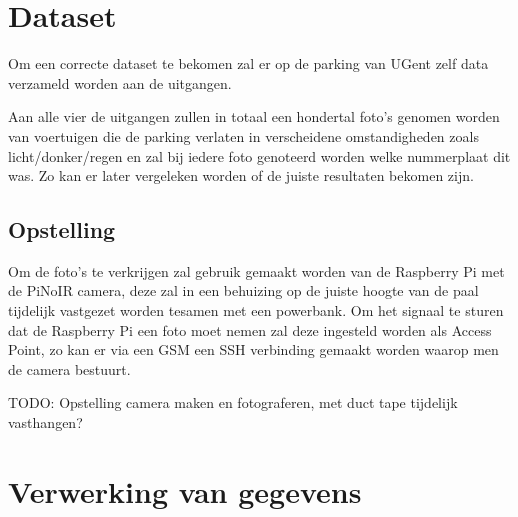 \section{Dataset}
Om een correcte dataset te bekomen zal er op de parking van UGent zelf data verzameld worden aan de uitgangen.

Aan alle vier de uitgangen zullen in totaal een hondertal foto's genomen worden van voertuigen die de parking verlaten in verscheidene omstandigheden zoals licht/donker/regen en zal bij iedere foto genoteerd worden welke nummerplaat dit was. Zo kan er later vergeleken worden of de juiste resultaten bekomen zijn.

\subsection{Opstelling}
Om de foto's te verkrijgen zal gebruik gemaakt worden van de Raspberry Pi met de PiNoIR camera, deze zal in een behuizing op de juiste hoogte van de paal tijdelijk vastgezet worden tesamen met een powerbank. Om het signaal te sturen dat de Raspberry Pi een foto moet nemen zal deze ingesteld worden als Access Point, zo kan er via een GSM een SSH verbinding gemaakt worden waarop men de camera bestuurt.

TODO: Opstelling camera maken en fotograferen, met duct tape tijdelijk vasthangen?

\section{Verwerking van gegevens}

